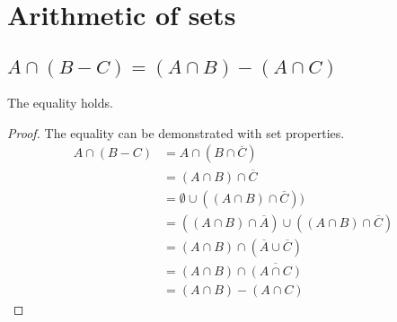 \section{Arithmetic of sets}
\subsection{$A \cap (B-C) = (A \cap B) - (A \cap C)$}
The equality holds.
\begin{proof} The equality can be demonstrated with set properties.
    \begin{align*}
        A \cap (B-C)
        &= A \cap (B \cap \overline{C})\\
        &= (A \cap B) \cap \overline{C}\\
        &= \emptyset \cup ((A \cap B) \cap \overline{C}))\\
        &= ((A \cap B) \cap \overline{A}) \cup ((A \cap B) \cap \overline{C})\\
        &= (A \cap B) \cap (\overline{A} \cup \overline{C})\\
        &= (A \cap B) \cap \overline{(A \cap C)}\\
        &= (A \cap B) - (A \cap C)
    \end{align*}
\end{proof}


